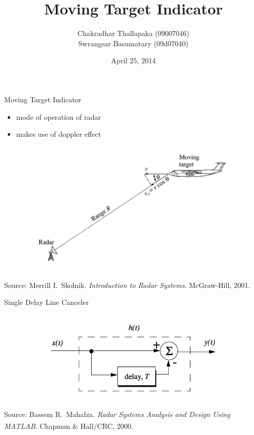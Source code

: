 \documentclass[mathserif]{beamer}
\title{Moving Target Indicator}
\author{Chakradhar Thallapaka (09007046) \\ Swrangsar Basumatary (09d07040) }
\institute{Department of Electrical Engineering \\ IIT Bombay, Powai}
\date{April 25, 2014}
\begin{document}
    \frame{\titlepage}
    
    
    \begin{frame}{Moving Target Indicator}
      \begin{minipage}[t][0.8\textheight][t]{\textwidth}    	
    	\begin{itemize}
		    \item mode of operation of radar
		    \item makes use of doppler effect
	    \end{itemize}
    	\begin{figure}[h]
    		\centering
    		\includegraphics[width=0.7\linewidth]{mti} 
    	\end{figure}
	\vfill
	\tiny{Source: Merrill I.~Skolnik. \emph{Introduction to Radar Systems}. McGraw-Hill, 2001.}
      \end{minipage}
    \end{frame}

    
    \begin{frame}{Single Delay Line Canceler}
      \begin{minipage}[t][0.8\textheight][t]{\textwidth}
	\begin{figure}[h]
		\centering
		\includegraphics[width=\linewidth]{singleDLC} 
	\end{figure}
	\vfill
	\tiny{Source: Bassem R.~Mahafza. \emph{Radar Systems Analysis and Design Using MATLAB\textsuperscript{\textregistered}}. Chapman \& Hall/CRC, 2000.} 
      \end{minipage}
    \end{frame}
    
\end{document}
